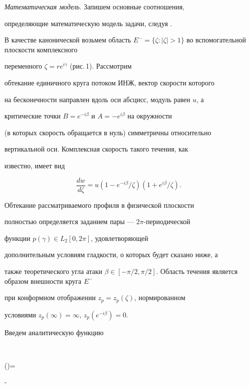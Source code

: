 {\it Математическая модель}. Запишем основные соотношения,


определяющие математическую модель задачи, следуя \cite{Eliz2}.





В качестве канонической возьмем область $E^{-} =\{\zeta: |


\zeta|> 1\}$ во вспомогательной плоскости комплексного


переменного $\zeta=re^{i\gamma}$ (рис.\,1). Рассмотрим


обтекание единичного круга потоком ИНЖ, вектор скорости которого


на бесконечности направлен вдоль оси абсцисс, модуль равен $u$, а


критические точки $B=e^{-i\beta}$ и $A=-e^{i\beta}$ на окружности


(в которых скорость обращается в нуль) симметричны относительно


вертикальной оси. Комплексная скорость такого течения, как


известно, имеет вид


$$


\frac{dw}{d\zeta}=u(1 - e^{-i\beta}/\zeta )(1+ e^{i\beta}/\zeta).


$$





Обтекание рассматриваемого профиля в физической плоскости


полностью определяется заданием пары --- $2\pi$-периодической


функции $p(\gamma) \in L_2 [0, 2\pi]$, удовлетворяющей


дополнительным условиям гладкости, о которых будет сказано ниже, а


также теоретического угла атаки $\beta \in [-\pi/2,


\pi/2]$. Область течения является образом внешности круга $E^{-}$


при конформном отображении $z_{p}=z_{p}(\zeta)$, нормированном


условиями $z_{p}(\infty)=\infty$, $z_{p}(e^{-i\beta})=0$.





Введем аналитическую функцию


$$


\chi(\zeta)=\ln


-


